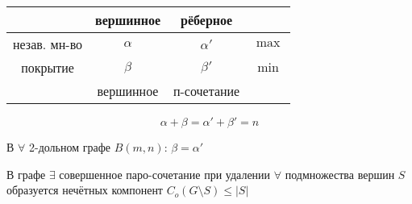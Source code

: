 \documentclass[a4paper,12pt]{article}
\begin{document}
\begin{center}
\begin{tabular}{|c|c|c|c|}
\cline{2-3}
\multicolumn{1}{c|}{} & вершинное & рёберное     & \multicolumn{1}{|c}{} \\ \hline
незав. мн-во          & $\alpha$  & $\alpha'$    & $\max$                \\ \hline
покрытие              & $\beta$   & $\beta'$     & $\min$                \\ \hline
\multicolumn{1}{c|}{} & вершинное & п-сочетание  & \multicolumn{1}{|c}{} \\ \cline{2-3}
\end{tabular}
\end{center}

\begin{theorem}[Галаи]
\[ \alpha + \beta = \alpha' + \beta' = n \]
\end{theorem}

\begin{theorem}[Кёнига]
В $\forall$ 2-дольном графе $B(m,n)$: $\beta = \alpha'$
\end{theorem}

\begin{theorem}[Татта]
В графе $\exists$ совершенное паро-сочетание \iiff при удалении $\forall$ подмножества вершин $S$ образуется нечётных компонент $C_o(G \setminus S) \leqslant |S|$
\end{theorem}
\end{document}
